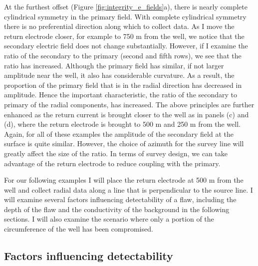 

At the furthest offset (Figure \ref{fig:integrity_e_fields}a), there is nearly complete cylindrical symmetry in the primary field. With complete cylindrical symmetry there is no preferential direction along which to collect data. As I move the return electrode closer, for example to 750 m from the well, we notice that the secondary electric field does not change substantially. However, if I examine the ratio of the secondary to the primary (second and fifth rows), we see that the ratio has increased. Although the primary field has similar, if not larger amplitude near the well, it also has considerable curvature. As a result, the proportion of the primary field that is in the radial direction has decreased in amplitude. Hence the important characteristic, the ratio of the secondary to primary of the radial components, has increased. The above principles are further enhanced as the return current is brought closer to the well as in panels (c) and (d), where the return electrode is brought to 500 m and 250 m from the well.  Again, for all of these examples the amplitude of the secondary field at the surface is quite similar. However, the choice of azimuth for the survey line will greatly affect the size of the ratio. In terms of survey design, we can take advantage of the return electrode to reduce coupling with the primary.

For our following examples I will place the return electrode at 500 m from the well and collect radial data along a line that is perpendicular to the source line. I will examine several factors influencing detectability of a flaw, including the depth of the flaw and the conductivity of the background in the following sections. I will also examine the scenario where only a portion of the circumference of the well has been compromised.


\subsection{Factors influencing detectability}
